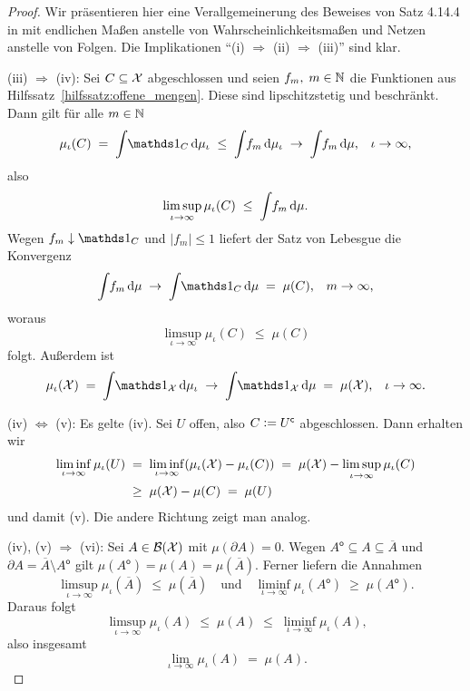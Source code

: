 \documentclass[../main/main.tex]{subfiles}
\begin{document}
	\begin{proof}
		Wir präsentieren hier eine Verallgemeinerung des Beweises von Satz 4.14.4 in \cite[Kapitel 4.14]{Simon.2015} mit endlichen Maßen 
		anstelle von Wahrscheinlichkeitsmaßen und Netzen anstelle von Folgen. Die Implikationen \enquote{(i) $\Rightarrow$ (ii) $\Rightarrow$ (iii)} sind klar. 
		
		(iii) $\Rightarrow$ (iv): Sei $C \subseteq \mathcal{X}$ abgeschlossen und seien 
		$f_m, \; m \in \mathbb{N}$ die Funktionen aus Hilfssatz~\ref{hilfssatz:offene_mengen}. 
		Diese sind lipschitzstetig und beschränkt.
		Dann gilt für alle $m \in \mathbb{N}$
		$$\mu_\iota(C) \; = \; \measureint{}{\indfct_C}{\mu_\iota} \; \leq \; 
		\measureint{}{f_m}{\mu_\iota} \; \to \;
		\measureint{}{f_m}{\mu} \text{,} \quad \iota \to \infty \text{,}$$
		also 
		$$\limsup_{\iota \to \infty} \mu_\iota(C) \; \leq \; 
		\int_{} \, f_m \, \mathrm{d}\mu \text{.}$$
		Wegen $f_m \convdown \indfct_C$ und $| f_m | \leq 1$ 
		liefert der Satz von Lebesgue die Konvergenz
		$$\measureint{}{f_m}{\mu} \; \to \;
		\measureint{}{\indfct_C}{\mu} \; = \; \mu(C) \text{,} 
		\quad m \to \infty \text{,}$$
		woraus
		$$\limsup_{\iota \to \infty} \mu_\iota(C) \; \leq \; \mu(C)$$
		folgt. Außerdem ist 
		$$\mu_\iota(\X) \; = \; \measureint{}{\indfct_{\X}}{\mu_\iota} \; \to \; \measureint{}{\indfct_{\X}}{\mu} \; = \; \mu(\X) \text{,} 
		\quad \iota \to \infty \text{.}$$
		
		(iv) $\Leftrightarrow$ (v): Es gelte (iv). Sei $U$ offen, also 
		$C \vcentcolon = U^\mathsf{c}$ abgeschlossen. Dann erhalten wir
		\begin{align*}
			\liminf_{\iota \to \infty} \mu_\iota(U) \; &= \; \liminf_{\iota \to \infty} (\mu_\iota(\mathcal{X}) - \mu_\iota(C)) \; = \;
			\mu(\mathcal{X}) - \limsup_{\iota \to \infty} \mu_\iota(C) \\
			&\geq \; 
			\mu(\mathcal{X}) - \mu(C) \; = \; \mu(U)
		\end{align*}
		und damit (v). Die andere Richtung zeigt man analog.
		
		(iv), (v) $\Rightarrow$ (vi): Sei $A \in \mathcal{B}(\mathcal{X})$ mit 
		$\mu(\partial A) = 0$. Wegen
		$A^\mathsf{o} \subseteq A \subseteq \overline{A}$ und 
		$\partial A = \overline{A} \setminus A^\mathsf{o}$ gilt $\mu(A^\mathsf{o}) = 
		\mu(A) = \mu(\overline{A}) \text{.}$
		Ferner liefern die Annahmen
		$$\limsup_{\iota \to \infty} \mu_\iota(\overline{A}) \; \leq \; 
		\mu(\overline{A}) \quad \text{und} \quad 
		\liminf_{\iota \to \infty} \mu_\iota(A^\mathsf{o}) \; \geq \; 
		\mu(A^\mathsf{o}) \text{.}$$
		Daraus folgt
		$$\limsup_{\iota \to \infty} \mu_\iota(A) \; \leq \; 
		\mu(A) \; \leq \; \liminf_{\iota \to \infty} \mu_\iota(A) \text{,}$$
		also insgesamt
		$$\lim_{\iota \to \infty} \mu_\iota(A) \; = \; \mu(A) \text{.}$$
		

\end{proof}
\end{document}
